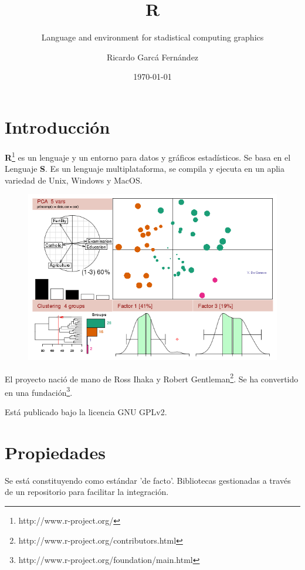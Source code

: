 \documentclass[11pt]{scrartcl}
\title{\textbf{R}}
\subtitle{Language and environment for stadistical computing graphics}
\author{Ricardo Garc\'a Fern\'andez}
\date{\today}
\begin{document}
\maketitle

\section{Introducci\'on}

\textbf{R}\footnote{http://www.r-project.org/} es un lenguaje y un entorno para datos y gr\'aficos estad\'isticos. Se basa en el Lenguaje \textbf{S}. Es un lenguaje multiplataforma, se compila y ejecuta en un aplia variedad de Unix, Windows y MacOS.

\begin{figure}[H]
    \begin{center}
    \centering
    \includegraphics[scale=0.7]{scripts/hpgraphic.png}
    \caption{}
    \label{fig:commits}
    \end{center}
\end{figure}

El proyecto naci\'o de mano de Ross Ihaka y Robert Gentleman\footnote{http://www.r-project.org/contributors.html}. Se ha convertido en una fundaci\'on\footnote{http://www.r-project.org/foundation/main.html}.

Est\'a publicado bajo la licencia GNU GPLv2.

\section{Propiedades}

Se est\'a constituyendo como est\'andar 'de facto'.
Bibliotecas gestionadas a trav\'es de un repositorio para facilitar la integraci\'on.
\end{document}
